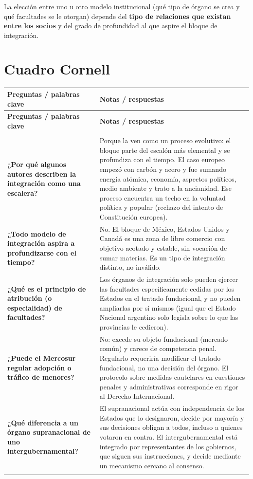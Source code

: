 \documentclass[12pt,oneside]{book}
\newlength{\cornizq}
\newlength{\cornder}
\newlength{\cornancho}
\newenvironment{cornell}
{%
    \small
    \renewcommand{\arraystretch}{1.3}%
    \begin{longtable}{>{\raggedright\arraybackslash}p{\cornizq}!{\vrule width 0.4pt}>{\raggedright\arraybackslash}p{\cornder}}
    \toprule
    \textbf{Preguntas / palabras clave} & \textbf{Notas / respuestas} \\
    \midrule
    \endfirsthead
    \toprule
    \textbf{Preguntas / palabras clave} & \textbf{Notas / respuestas} \\
    \midrule
    \endhead
    \midrule
    \multicolumn{2}{r}{\footnotesize\itshape continúa en la página siguiente} \\
    \endfoot
    \bottomrule
    \endlastfoot
}
{%
    \end{longtable}%
}
\begin{document}
La elección entre uno u otro modelo institucional (qué tipo de órgano se crea y qué facultades se le otorgan) depende del \textbf{tipo de relaciones que existan entre los socios} y del grado de profundidad al que aspire el bloque de integración.

\section{Cuadro Cornell}

\begin{cornell}
\textbf{¿Por qué algunos autores describen la integración como una escalera?} &
Porque la ven como un proceso evolutivo: el bloque parte del escalón más elemental y se profundiza con el tiempo. El caso europeo empezó con carbón y acero y fue sumando energía atómica, economía, aspectos políticos, medio ambiente y trato a la ancianidad. Ese proceso encuentra un techo en la voluntad política y popular (rechazo del intento de Constitución europea). \\
\textbf{¿Todo modelo de integración aspira a profundizarse con el tiempo?} &
No. El bloque de México, Estados Unidos y Canadá es una zona de libre comercio con objetivo acotado y estable, sin vocación de sumar materias. Es un tipo de integración distinto, no inválido. \\
\textbf{¿Qué es el principio de atribución (o especialidad) de facultades?} &
Los órganos de integración solo pueden ejercer las facultades específicamente cedidas por los Estados en el tratado fundacional, y no pueden ampliarlas por sí mismos (igual que el Estado Nacional argentino solo legisla sobre lo que las provincias le cedieron). \\
\textbf{¿Puede el Mercosur regular adopción o tráfico de menores?} &
No: excede su objeto fundacional (mercado común) y carece de competencia penal. Regularlo requeriría modificar el tratado fundacional, no una decisión del órgano. El protocolo sobre medidas cautelares en cuestiones penales y administrativas corresponde en rigor al Derecho Internacional. \\
\textbf{¿Qué diferencia a un órgano supranacional de uno intergubernamental?} &
El supranacional actúa con independencia de los Estados que lo designaron, decide por mayoría y sus decisiones obligan a todos, incluso a quienes votaron en contra. El intergubernamental está integrado por representantes de los gobiernos, que siguen sus instrucciones, y decide mediante un mecanismo cercano al consenso. \\
\midrule
{} \\
\end{cornell}
\end{document}
